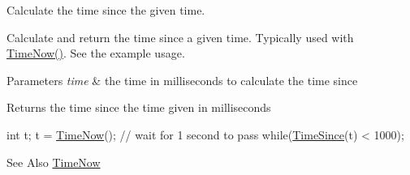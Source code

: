 Calculate the time since the given time. 

Calculate and return the time since a given time. Typically used with \hyperlink{group__timing_ga73cbb4be98d4067316fa48f157e0ef2f}{Time\+Now()}. See the example usage.


\begin{DoxyParams}{Parameters}
{\em time} & the time in milliseconds to calculate the time since \\
\hline
\end{DoxyParams}
\begin{DoxyReturn}{Returns}
the time since the time given in milliseconds
\end{DoxyReturn}

\begin{DoxyCode}
\textcolor{keywordtype}{int} t;
t = \hyperlink{group__timing_ga73cbb4be98d4067316fa48f157e0ef2f}{TimeNow}();
\textcolor{comment}{// wait for 1 second to pass}
\textcolor{keywordflow}{while}(\hyperlink{group__timing_ga32e3bcf2162e557d8db29577c4bd8d40}{TimeSince}(t) < 1000);
\end{DoxyCode}


\begin{DoxySeeAlso}{See Also}
\hyperlink{group__timing_ga73cbb4be98d4067316fa48f157e0ef2f}{Time\+Now} 
\end{DoxySeeAlso}
